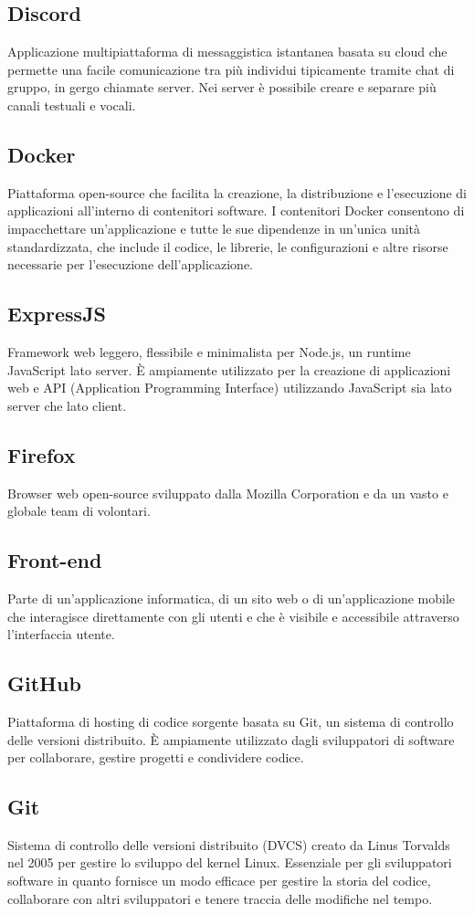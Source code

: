 \subsection{Discord}Applicazione multipiattaforma di messaggistica istantanea basata su cloud che permette una facile comunicazione tra più individui tipicamente tramite chat di gruppo, in gergo chiamate server. Nei server è possibile creare e separare più canali testuali e vocali.
\subsection{Docker}Piattaforma open-source che facilita la creazione, la distribuzione e l'esecuzione di applicazioni all'interno di contenitori software. I contenitori Docker consentono di impacchettare un'applicazione e tutte le sue dipendenze in un'unica unità standardizzata, che include il codice, le librerie, le configurazioni e altre risorse necessarie per l'esecuzione dell'applicazione.
\subsection{ExpressJS}Framework web leggero, flessibile e minimalista per Node.js, un runtime JavaScript lato server. È ampiamente utilizzato per la creazione di applicazioni web e API (Application Programming Interface) utilizzando JavaScript sia lato server che lato client.
\subsection{Firefox}Browser web open-source sviluppato dalla Mozilla Corporation e da un vasto e globale team di volontari.
\subsection{Front-end}Parte di un'applicazione informatica, di un sito web o di un'applicazione mobile che interagisce direttamente con gli utenti e che è visibile e accessibile attraverso l'interfaccia utente.
\subsection{GitHub}Piattaforma di hosting di codice sorgente basata su Git, un sistema di controllo delle versioni distribuito. È ampiamente utilizzato dagli sviluppatori di software per collaborare, gestire progetti e condividere codice.
\subsection{Git}Sistema di controllo delle versioni distribuito (DVCS) creato da Linus Torvalds nel 2005 per gestire lo sviluppo del kernel Linux. Essenziale per gli sviluppatori software in quanto fornisce un modo efficace per gestire la storia del codice, collaborare con altri sviluppatori e tenere traccia delle modifiche nel tempo.

